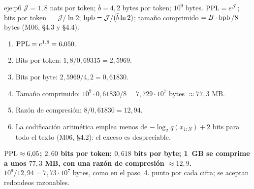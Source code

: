 \begin{solucion}{eje:p6}
\datos $\mathcal J=1{,}8$ nats por token; $\bar b=4{,}2$ bytes por token; $10^{9}$ bytes.
\planteamiento $\operatorname{PPL}=e^{\mathcal J}$; bits por token $=\mathcal J/\ln2$; $\operatorname{bpb}=\mathcal J/(\bar b\ln2)$; tamaño comprimido $=B\cdot\operatorname{bpb}/8$ bytes (M06, §4.3 y §4.4).
\pasos
\begin{enumerate}[label=\arabic*.]
  \item $\operatorname{PPL}=e^{1{,}8}=6{,}050$.
  \item Bits por token: $1{,}8/0{,}69315=2{,}5969$.
  \item Bits por byte: $2{,}5969/4{,}2=0{,}61830$.
  \item Tamaño comprimido: $10^{9}\cdot0{,}61830/8=7{,}729\cdot10^{7}$ bytes $\approx77{,}3$ MB.
  \item Razón de compresión: $8/0{,}61830=12{,}94$.
  \item La codificación aritmética emplea menos de $-\log_2q(x_{1:N})+2$ bits para todo el texto (M06, §4.2): el exceso es despreciable.
\end{enumerate}
\resultado \textbf{$\operatorname{PPL}\approx6{,}05$; $2{,}60$ bits por token; $0{,}618$ bits por byte; 1~GB se comprime a unos $77{,}3$ MB, con una razón de compresión $\approx12{,}9$.}
\comprobacion $10^{9}/12{,}94=7{,}73\cdot10^{7}$ bytes, como en el paso~4.
 punto por cada cifra; se aceptan redondeos razonables.

\end{solucion}
